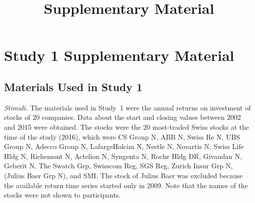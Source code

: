 \title{Supplementary Material}



\section{Study 1 Supplementary Material}
\subsection{Materials Used in Study 1}
\label{sup:study1_material}
\textit{Stimuli.} The materials used in Study~1 were the annual returns on investment of stocks of 20 companies. Data about the start and closing values between 2002 and 2015 were obtained. The stocks were the 20 most-traded Swiss stocks at the time of the study (2016), which were CS Group N,
ABB N,
Swiss Re N,
UBS Group N,
Adecco Group N,
LafargeHolcim N,
Nestle N,
Novartis N,
Swiss Life Hldg N,
Richemont N,
Actelion N,
Syngenta N,
Roche Hldg DR,
Givaudan N,
Geberit N,
The Swatch Grp,
Swisscom Reg,
SGS Reg,
Zurich Insur Grp N,
(Julius Baer Grp N),
and SMI.
The stock of Julius Baer was excluded because the available return time series started only in 2009. Note that the names of the stocks were not shown to participants. 

